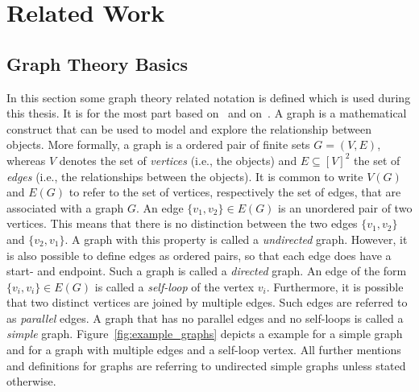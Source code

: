 \chapter{Related Work}


\section{Graph Theory Basics}

In this section some graph theory related notation is defined which is used during this thesis.
It is for the most part based on~\cite{Thulasiraman1992} and on~\cite{Diestel2012}.
A graph is a mathematical construct that can be used to model and explore the relationship between objects.
More formally, a graph is a ordered pair of finite sets \(G = (V, E)\), whereas \(V\) denotes the set of \emph{vertices} (i.e., the objects) and \(E \subseteq [V]^{2} \) the set of \emph{edges} (i.e., the relationships between the objects).
It is common to write \(V(G)\) and \(E(G)\) to refer to the set of vertices, respectively the set of edges, that are associated with a graph \(G\).
An edge \(\{v_1, v_2\} \in E(G)\) is an unordered pair of two vertices.
This means that there is no distinction between the two edges \(\{v_1, v_2 \}\) and \(\{v_2, v_1\}\).
A graph with this property is called a \emph{undirected} graph.
However, it is also possible to define edges as ordered pairs, so that each edge does have a start- and endpoint.
Such a graph is called a \emph{directed} graph.
An edge of the form \(\{v_i, v_i\} \in E(G)\) is called a \emph{self-loop} of the vertex \(v_i\).
Furthermore, it is possible that two distinct vertices are joined by multiple edges.
Such edges are referred to as \emph{parallel} edges.
A graph that has no parallel edges and no self-loops is called a \emph{simple} graph.
Figure~\ref{fig:example_graphs} depicts a example for a simple graph and for a graph with multiple edges and a self-loop vertex.
All further mentions and definitions for graphs are referring to undirected simple graphs unless stated otherwise.

